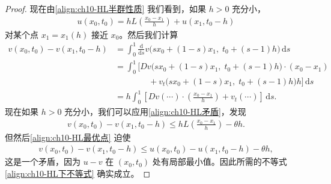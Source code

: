\documentclass[../../main.tex]{subfiles}
\begin{document}
\begin{proof}
现在由\eqref{align:ch10-HL半群性质} 我们看到，如果 $h>0$ 充分小，
\begin{align}
u(x_0,t_0)=hL\left(\frac{x_0-x_1}{h}\right)+u(x_1,t_0-h)
\label{align:ch10-HL最优点}
\end{align}
对某个点 $x_1=x_1(h)$ 接近 $x_0$。然后我们计算
\begin{align*}
v(x_0,t_0)-v(x_1,t_0-h) &= \int_0^1\frac{\mathrm{d}}{\mathrm{d}s}v\big(sx_0+(1-s)x_1,\;t_0+(s-1)h\big)\,\mathrm{d}s\\
&= \int_0^1\bigg[Dv\big(sx_0+(1-s)x_1,\;t_0+(s-1)h\big)\cdot(x_0-x_1)\\
&\qquad\qquad +v_t\big(sx_0+(1-s)x_1,\;t_0+(s-1)h\big)h\bigg]\,\mathrm{d}s\\
&= h\int_0^1\left[Dv(\cdots)\cdot\left(\frac{x_0-x_1}{h}\right)+v_t(\cdots)\right]\,\mathrm{d}s.
\end{align*}
现在如果 $h>0$ 充分小，我们可以应用\eqref{align:ch10-HL矛盾}，发现
\begin{align*}
v(x_0,t_0)-v(x_1,t_0-h)\leqslant hL\left(\frac{x_0-x_1}{h}\right)-\theta h.
\end{align*}
但然后\eqref{align:ch10-HL最优点} 迫使
\begin{align*}
v(x_0,t_0)-v(x_1,t_0-h)\leqslant u(x_0,t_0)-u(x_1,t_0-h)-\theta h,
\end{align*}
这是一个矛盾，因为 $u-v$ 在 $(x_0,t_0)$ 处有局部最小值。因此所需的不等式\eqref{align:ch10-HL下不等式} 确实成立。
\end{proof}
\end{document}
